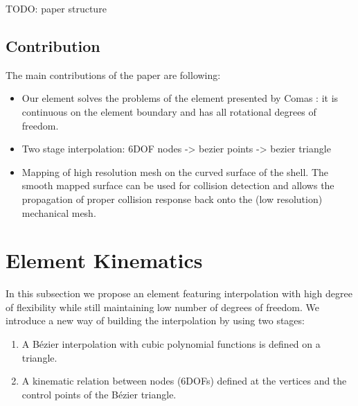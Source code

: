 \documentclass{egpubl}
\begin{document}
TODO: paper structure

\subsection{Contribution}

The main contributions of the paper are following:
\begin{itemize}
    \item Our element solves the problems of the element presented by Comas
        \cite{Comas2010c}: it is continuous on the element boundary and has
        all rotational degrees of freedom.

    \item Two stage interpolation: 6DOF nodes -> bezier points -> bezier
        triangle


    \item Mapping of high resolution mesh on the curved surface of the
        shell. The smooth mapped surface can be used for collision
        detection and allows the propagation of proper collision response
        back onto the (low resolution) mechanical mesh.

\end{itemize}



\section{Element Kinematics} %

In this subsection we propose an element featuring interpolation with high degree of flexibility while still maintaining low number of degrees of freedom.
We introduce a new way of building the interpolation by using two stages:
\begin{enumerate}
    \item A B\'ezier interpolation with cubic polynomial functions is defined on a triangle.
    \item A kinematic relation between nodes (6DOFs) defined at the vertices and the control points of the B\'ezier triangle.
\end{enumerate}
\end{document}
